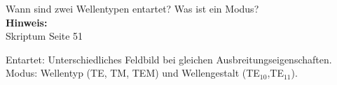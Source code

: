 \begin{question}[section=4,name={Entartung},difficulty=,quantity=1,type=thr,tags={20130724,20130625}]
	Wann sind zwei Wellentypen entartet? Was ist ein Modus?
	\\ \textbf{Hinweis:}\\
	Skriptum Seite 51
\end{question}
\begin{solution}
	Entartet: Unterschiedliches Feldbild bei gleichen Ausbreitungseigenschaften.\\
	Modus: Wellentyp (TE, TM, TEM) und  Wellengestalt (TE$_{10}$,TE$_{11}$).
\end{solution}